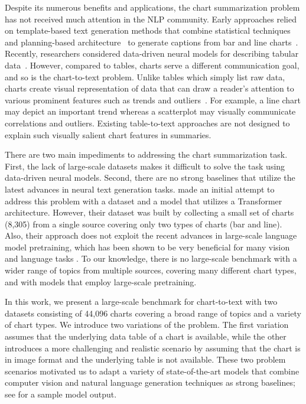 \documentclass[11pt]{article}
\newcommand{\change}[1]{{\leavevmode\color{black}#1}}%
\begin{document}
Despite its numerous benefits and applications, the chart summarization problem  has not received much attention in the NLP community.  Early approaches relied on template-based text generation methods that combine statistical techniques and planning-based architecture~\cite{reiter2007architecture} to generate captions from bar and line charts~\cite{fasciano1996postgraphe, mittal-etal-1998-describing, green2004autobrief,  demir-etal-2012-summarizing}. Recently, researchers considered data-driven neural models for describing tabular data~\cite{mei2016talk, gong-etal-2019-enhanced}. 
\change{However, compared to tables, charts serve a different communication goal, and so is the chart-to-text problem. Unlike tables which simply list raw data, 
charts create visual representation of data that can draw a reader’s attention to various prominent features such as trends and outliers~\cite{kim2021towards}.  For example, a line chart may depict an important trend whereas a scatterplot may visually communicate correlations and outliers. 
Existing table-to-text approaches are not designed to explain such visually salient chart features in summaries.} 


There are two main impediments to addressing the chart summarization task. First, the lack of large-scale datasets makes it difficult to solve the  task using data-driven neural models. Second, there are no strong baselines that  utilize the latest advances in neural text generation tasks. \citet{obeid} made an initial attempt to address this problem with a dataset and a model that utilizes a Transformer \cite{Vaswani2017attn}  architecture. 
However, their dataset was built by collecting a small set of charts (8,305) from a single source covering only two types of charts (bar and line). Also, their approach does not exploit the recent advances in large-scale language model pretraining, which has been shown to be very beneficial for many vision and language tasks \cite{devlin-etal-2019-bert,pmlr-v139-touvron21a}. To our knowledge, there is no large-scale benchmark with a wider range of topics from multiple sources, covering many different chart types, and with models that employ large-scale pretraining.

In this work, we present a large-scale benchmark for chart-to-text with two datasets consisting of 44,096 charts  covering a broad range of topics and a variety of chart types. We introduce two variations of the problem. The first variation assumes that the underlying data table of a chart is available, while the other introduces a more challenging and realistic scenario by assuming that the chart is in image format and the underlying table is not available. These two problem scenarios motivated us to adapt a variety of state-of-the-art models that combine computer vision and natural language generation techniques as strong baselines; see  for a sample model output.
\end{document}
